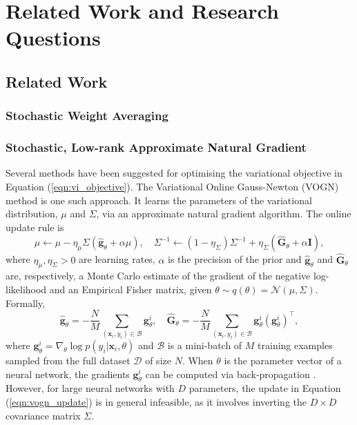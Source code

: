 \documentclass[msc,deptreport.inf]{infthesis} %
\newcommand{\matr}[1]{\mathbf{#1}}
\begin{document}
\chapter{Related Work and Research Questions}\label{ch:previous_work}

\section{Related Work}\label{sec:related_work}

\subsection{Stochastic Weight Averaging}

\subsection{Stochastic, Low-rank Approximate Natural Gradient}

Several methods have been suggested for optimising the variational objective in Equation (\ref{eqn:vi_objective}). The Variational Online Gauss-Newton (VOGN) method \cite{tangkaratt2018} is one such approach. It learns the parameters of the variational distribution, $\mu$ and $\Sigma$, via an approximate natural gradient algorithm. The online update rule is
\begin{equation}\label{eqn:vogn_update}
	\mu \leftarrow \mu - \eta_\mu \Sigma (\hat{\matr{g}}_\theta + \alpha \mu), \quad 
	\Sigma^{-1} \leftarrow (1 - \eta_\Sigma) \Sigma^{-1} + \eta_\Sigma(\hat{\matr{G}}_\theta + \alpha \matr{I}),
\end{equation}
where $\eta_\mu, \eta_\Sigma > 0$ are learning rates, $\alpha$ is the precision of the prior and $\hat{\matr{g}}_\theta$ and $\hat{\matr{G}}_\theta$ are, respectively, a Monte Carlo estimate of the gradient of the negative log-likelihood and an Empirical Fisher matrix, given $\theta \sim q(\theta) = \mathcal{N}(\mu, \Sigma)$. Formally, 
\begin{equation}\label{eqn:slang_g_and_G}
	\hat{\matr{g}}_\theta = -\frac{N}{M} \sum_{(\matr{x}_i, y_i) \in \mathcal{B}} \matr{g}_\theta^i, \quad
	\hat{\matr{G}}_\theta = -\frac{N}{M} \sum_{(\matr{x}_i, y_i) \in \mathcal{B}} \matr{g}_\theta^i (\matr{g}_\theta^i)^\intercal,
\end{equation}
where $\matr{g}_\theta^i = \nabla_\theta \log p(y_i | \matr{x}_i, \theta)$ and $\mathcal{B}$ is a mini-batch of $M$ training examples sampled from the full dataset $\mathcal{D}$ of size $N$. When $\theta$ is the parameter vector of a neural network, the gradients $\matr{g}_\theta^i$ can be computed via back-propagation \cite{rumelhart1986}. However, for large neural networks with $D$ parameters, the update in Equation (\ref{eqn:vogn_update}) is in general infeasible, as it involves inverting the $D \times D$ covariance matrix $\Sigma$.
\end{document}
